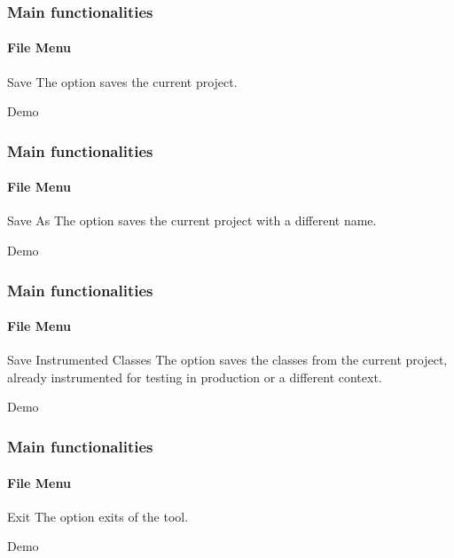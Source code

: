 \begin{frame}
\frametitle{Main functionalities}
\framesubtitle{File Menu}
\label{concept:save}

\begin{block}{Save}
The  option saves the current project.
\end{block}

\begin{block}{Demo}
\end{block}
\end{frame}



\begin{frame}
\frametitle{Main functionalities}
\framesubtitle{File Menu}
\label{concept:save-as}

\begin{block}{Save As}
The  option saves the current project with a different name.
\end{block}

\begin{block}{Demo}
\end{block}
\end{frame}



\begin{frame}
\frametitle{Main functionalities}
\framesubtitle{File Menu}
\label{concept:save-instrumented-classes}

\begin{block}{Save Instrumented Classes}
The  option saves the classes from the
current project, already instrumented for testing in production or a different
context.
\end{block}

\begin{block}{Demo}
\end{block}
\end{frame}



\begin{frame}
\frametitle{Main functionalities}
\framesubtitle{File Menu}
\label{concept:exit}

\begin{block}{Exit}
The  option exits of the tool.
\end{block}

\begin{block}{Demo}
\end{block}
\end{frame}
